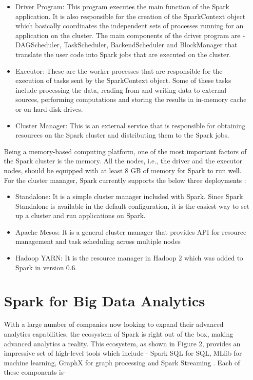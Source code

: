 \documentclass[sigconf]{acmart}
\begin{document}
\begin{itemize}
	\item Driver Program: This program executes the main function of the Spark application. It is also responsible for the creation of the SparkContext object which basically coordinates the independent sets of processes running for an application on the cluster. The main components of the driver program are - DAGScheduler, TaskScheduler, BackendScheduler and BlockManager that translate the user code into Spark jobs that are executed on the cluster.
	\item Executor: These are the worker processes that are responsible for the execution of tasks sent by the SparkContext object. Some of these tasks include processing the data, reading from and writing data to external sources, performing computations and storing the results in in-memory cache or on hard disk drives.
	\item Cluster Manager: This is an external service that is responsible for obtaining resources on the Spark cluster and distributing them to the Spark jobs.
\end{itemize}

Being a memory-based computing platform, one of the most important factors of the Spark cluster is the memory. All the nodes, i.e., the driver and the executor nodes, should be equipped with at least 8 GB of memory for Spark to run well. For the cluster manager, Spark currently supports the below three deployments \cite{fu2016spark-p1}:

\begin{itemize}
	\item Standalone: It is a simple cluster manager included with Spark. Since Spark Standalone is available in the default configuration, it is the easiest way to set up a cluster and run applications on Spark.
	\item Apache Mesos: It is a general cluster manager that provides API for resource management and task scheduling across multiple nodes
	\item Hadoop YARN: It is the resource manager in Hadoop 2 which was added to Spark in version 0.6.
\end{itemize}

\section{Spark for Big Data Analytics}
With a large number of companies now looking to expand their advanced analytics capabilities, the ecosystem of Spark is right out of the box, making advanced analytics a reality. This ecosystem, as shown in Figure 2, provides an impressive set of high-level tools which include - Spark SQL for SQL, MLlib for machine learning, GraphX for graph processing and Spark Streaming \cite{fu2016spark-p1}. Each of these components is-
\end{document}
